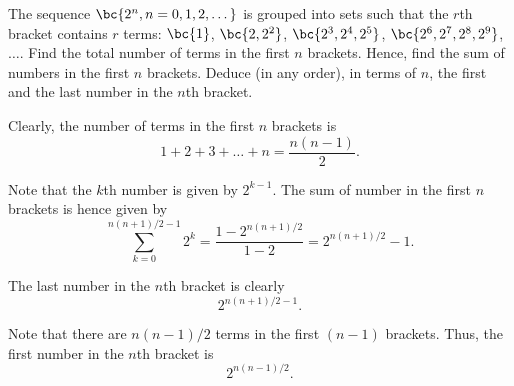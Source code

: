 \begin{problem}
    The sequence $\bc{2^n, n = 0, 1, 2, \dots}$ is grouped into sets such that the $r$th bracket contains $r$ terms: $\bc{1}$, $\bc{2, 2^2}$, $\bc{2^3, 2^4, 2^5}$, $\bc{2^6, 2^7, 2^8, 2^9}$, $\dots$. Find the total number of terms in the first $n$ brackets. Hence, find the sum of numbers in the first $n$ brackets. Deduce (in any order), in terms of $n$, the first and the last number in the $n$th bracket.
\end{problem}
\begin{solution}
    Clearly, the number of terms in the first $n$ brackets is \[1 + 2 + 3 + \dots + n = \frac{n(n-1)}{2}.\]

    Note that the $k$th number is given by $2^{k-1}$. The sum of number in the first $n$ brackets is hence given by \[\sum_{k = 0}^{n(n+1)/2 - 1} 2^k = \frac{1 - 2^{n(n+1)/2}}{1 - 2} = 2^{n(n+1)/2} - 1.\]

    The last number in the $n$th bracket is clearly \[2^{n(n+1)/2 -1}.\]

    Note that there are $n(n-1)/2$ terms in the first $(n-1)$ brackets. Thus, the first number in the $n$th bracket is \[2^{n(n-1)/2}.\]
\end{solution}